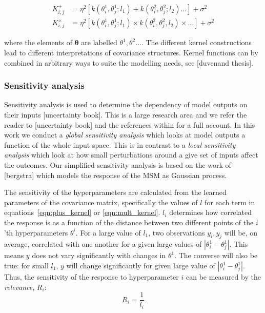 \documentclass[journal=jacsat,manuscript=article]{achemso}
\begin{document}
\begin{align}
    K^{\mathrm{+}}_{i,j} & = \eta^2  \left [k(\theta^{1}_i, \theta^{1}_j; l_{1}) + k(\theta^{2}_i, \theta^{2}_j; l_{2}) \ldots \right ] + \sigma^2  \label{eqn:plus_kernel} \\ 
    K^{\mathrm{\times}}_{i,j} & = \eta^2  \left [k(\theta^{1}_i, \theta^{1}_j; l_{1}) \times k(\theta^{2}_i, \theta^{2}_j, l_{2}) \times \ldots \right ] + \sigma^2 \label{eqn:mult_kernel}
\end{align}

where the elements of $\bm{\theta}$ are labelled $\theta^{1}, \theta^{2} \ldots$. The different kernel constructions lead to different interpretations of covariance structures.  Kernel functions can by combined in arbitrary ways to suite the modelling needs, see [duvenand thesis]. 

\subsubsection{Sensitivity analysis}

Sensitivity analysis is used to determine the dependency of model outputs on their inputs [uncertainty book]. This is a large research area and we refer the reader to [uncertainty book] and the references within for a full account.  In this work we conduct a \emph{global sensitivity analysis} which looks at model outputs a function of the whole input space. This is in contrast to a \emph{local sensitivity analysis} which look at  how small perturbations around a give set of inputs affect the outcomes.  Our simplified sensitivity analysis is based on the work of [bergstra] which models the response of the MSM as Gaussian process.  

The sensitivity of the hyperparameters are calculated from the learned parameters of the covariance matrix, specifically the values of $l$ for each term in equations~\ref{eqn:plus_kernel} or \ref{eqn:mult_kernel}.  $l_{i}$  determines how correlated the response is as a function of the distance between two different points of the $i$'th hyperparameters $\theta^{i}$. For a large value of $l_{1}$, two observations $y_{i}, y_{j}$ will be, on average, correlated with one another for a given large values of $|\theta_{i}^{1} - \theta_{j}^{1}|$. This means $y$ does not vary significantly with changes in $\theta^{1}$. The converse will also be true: for small $l_{1}$, $y$ will change significantly for given large value of $|\theta_{i}^{1} - \theta_{j}^{1}|$. Thus, the sensitivity of the response to hyperparameter $i$ can be measured by the \emph{relevance}, $R_{i}$: 
\begin{equation}\label{eqn:relevance_def}
    R_{i} = \frac{1}{l_{i}}
\end{equation}
\end{document}
